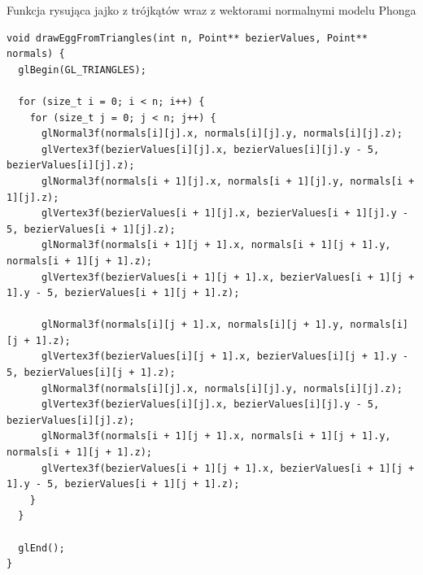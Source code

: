 \documentclass[12pt,a4paper,titlepage]{article}
\begin{document}
\begin{listing}[H]
\caption{Funkcja rysująca jajko z trójkątów wraz z wektorami normalnymi modelu Phonga}
\begin{verbatim}
void drawEggFromTriangles(int n, Point** bezierValues, Point** normals) {
  glBegin(GL_TRIANGLES);

  for (size_t i = 0; i < n; i++) {
    for (size_t j = 0; j < n; j++) {
      glNormal3f(normals[i][j].x, normals[i][j].y, normals[i][j].z);
      glVertex3f(bezierValues[i][j].x, bezierValues[i][j].y - 5, bezierValues[i][j].z);
      glNormal3f(normals[i + 1][j].x, normals[i + 1][j].y, normals[i + 1][j].z);
      glVertex3f(bezierValues[i + 1][j].x, bezierValues[i + 1][j].y - 5, bezierValues[i + 1][j].z);
      glNormal3f(normals[i + 1][j + 1].x, normals[i + 1][j + 1].y, normals[i + 1][j + 1].z);
      glVertex3f(bezierValues[i + 1][j + 1].x, bezierValues[i + 1][j + 1].y - 5, bezierValues[i + 1][j + 1].z);
      
      glNormal3f(normals[i][j + 1].x, normals[i][j + 1].y, normals[i][j + 1].z);
      glVertex3f(bezierValues[i][j + 1].x, bezierValues[i][j + 1].y - 5, bezierValues[i][j + 1].z);
      glNormal3f(normals[i][j].x, normals[i][j].y, normals[i][j].z);
      glVertex3f(bezierValues[i][j].x, bezierValues[i][j].y - 5, bezierValues[i][j].z);
      glNormal3f(normals[i + 1][j + 1].x, normals[i + 1][j + 1].y, normals[i + 1][j + 1].z);
      glVertex3f(bezierValues[i + 1][j + 1].x, bezierValues[i + 1][j + 1].y - 5, bezierValues[i + 1][j + 1].z);
    }
  }

  glEnd();
}
\end{verbatim}
\end{listing}
\hfill \break
\hfill \break
\end{document}
